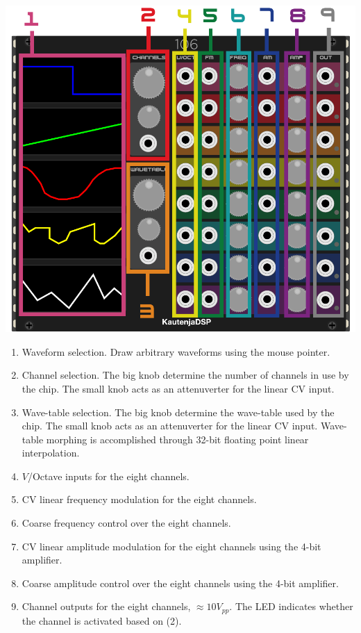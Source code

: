 \documentclass[12pt,a4paper]{article}
\begin{document}
\begin{center}
\includegraphics{106-Manual}
\end{center}

\begin{enumerate}
  \item Waveform selection. Draw arbitrary waveforms using the mouse pointer.
  \item Channel selection. The big knob determine the number of channels in use by the chip. The small knob acts as an attenuverter for the linear CV input.
  \item Wave-table selection. The big knob determine the wave-table used by the chip. The small knob acts as an attenuverter for the linear CV input. Wave-table morphing is accomplished through 32-bit floating point linear interpolation.
  \item $V$/Octave inputs for the eight channels.
  \item CV linear frequency modulation for the eight channels.
  \item Coarse frequency control over the eight channels.
  \item CV linear amplitude modulation for the eight channels using the 4-bit amplifier.
  \item Coarse amplitude control over the eight channels using the 4-bit amplifier.
  \item Channel outputs for the eight channels, ${\approx}10V_{pp}$. The LED indicates whether the channel is activated based on (2).
\end{enumerate}


\clearpage
\renewcommand\refname{References \& Acknowledgments}
\nocite{*}


\end{document}
